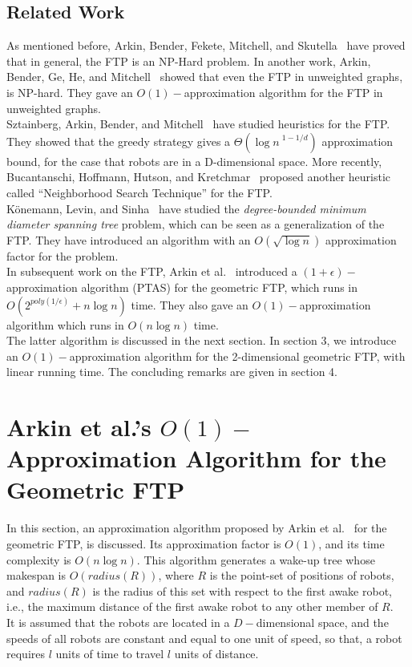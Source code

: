 \documentclass[review]{elsarticle}
\begin{document}
\subsection{Related Work}
As mentioned before, Arkin, Bender, Fekete, Mitchell, and Skutella~\cite{Arkin2006} have proved that in general, the FTP is an NP-Hard problem. In another work, Arkin, Bender, Ge, He, and Mitchell~\cite{Arkin2003} showed that even the FTP in unweighted graphs, is NP-hard. They gave an $O(1)-$approximation algorithm for the FTP in unweighted graphs.\\
Sztainberg, Arkin, Bender, and Mitchell~\cite{sztainberg2004} have studied heuristics for the FTP. They showed that the greedy strategy gives a $\Theta({\log n~}^{1-1/d})$ approximation bound, for the case that robots are in a D-dimensional space. More recently, Bucantanschi, Hoffmann, Hutson, and Kretchmar~\cite{Bucantanschi2007} proposed another heuristic called ``Neighborhood Search Technique'' for the FTP.\\
Könemann, Levin, and Sinha~\cite{Konemann2004} have studied the \textit{degree-bounded minimum diameter spanning tree} problem, which can be seen as a generalization of the FTP. They have introduced an algorithm with an $O(\sqrt{\log n})$ approximation factor for the problem.\\
In subsequent work on the FTP, Arkin et al.~\cite{Arkin2006} introduced a  $(1+\epsilon)-$approximation algorithm (PTAS) for the geometric FTP, which runs in $O(2^{poly(1/\epsilon)}+n\log n)$ time. They also gave an $O(1)-$approximation algorithm which runs in $O(n\log n)$ time.\\
The latter algorithm is discussed in the next section. In section 3, we introduce an $O(1)-$approximation algorithm for the 2-dimensional geometric FTP, with linear running time. The concluding remarks are given in section 4.

\section{Arkin et al.'s $O(1)-$Approximation Algorithm for the Geometric FTP}
In this section, an approximation algorithm proposed by Arkin et al.~\cite{Arkin2006} for the geometric FTP, is discussed. Its approximation factor is $O(1)$, and its time complexity is $O(n\log n)$. This algorithm generates a wake-up tree whose makespan is $O(radius(R))$, where $R$ is the point-set of positions of robots, and $radius(R)$ is the radius of this set with respect to the first awake robot, i.e., the maximum distance of the first awake robot to any other member of $R$.\\
It is assumed that the robots are located in a $D-$dimensional space, and the speeds of all robots are constant and equal to one unit of speed, so that, a robot requires $l$ units of time to travel $l$ units of distance.
\end{document}
